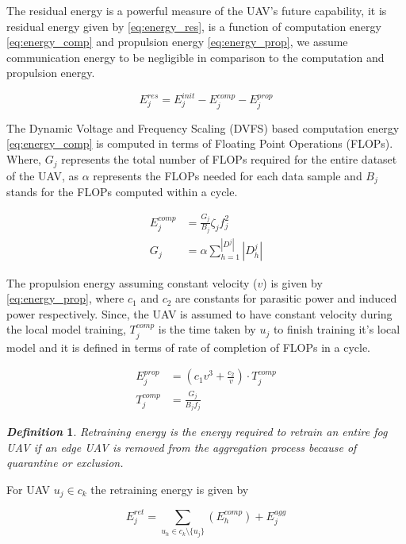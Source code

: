 \documentclass[10pt,journal,compsoc]{IEEEtran}
\newtheorem{mydef}{\textbf{\textit{Definition}}}
\begin{document}
The residual energy is a powerful measure of the UAV's future capability, it is residual energy given by \eqref{eq:energy_res}, is a function of computation energy \eqref{eq:energy_comp} and propulsion energy \eqref{eq:energy_prop}, we assume communication energy to be negligible in comparison to the computation and propulsion energy.

\begin{equation}\label{eq:energy_res}
E_j^{res} = E_j^{init} - E_j^{comp} - E_j^{prop}
\end{equation}

The Dynamic Voltage and Frequency Scaling (DVFS) based computation energy \eqref{eq:energy_comp} \cite{comp_energy} is computed in terms of Floating Point Operations (FLOPs).
Where, $G_j$ represents the total number of FLOPs required for the entire dataset of the UAV, as $\alpha$ represents the FLOPs needed for each data sample and $B_j$ stands for the FLOPs computed within a cycle. 

\begin{align}\label{eq:energy_comp}
E_j^{comp} 
&=
\frac {G_j} {B_j} \zeta_j f_j^2
\\
G_j
&=
\alpha \sum_{h = 1}^{|D^j|} |D_h^{j}|
\end{align}

The propulsion energy assuming constant velocity ($v$) \cite{prop_energy} is given by \eqref{eq:energy_prop}, where $c_1$ and $c_2$ are constants for parasitic power and induced power respectively. Since, the UAV is assumed to have constant velocity during the local model training, $T_j^{comp}$ is the time taken by $u_j$ to finish training it's local model and it is defined in terms of rate of completion of FLOPs in a cycle.

\begin{align}\label{eq:energy_prop}
E_j^{prop} 
&= 
\left( c_1 v^3 + \frac {c_2} {v} \right) 
\cdot
T_j^{comp}
\\
T_j^{comp}
&=
\frac{G_j}{B_j f_j}
\end{align}


\begin{mydef}
 Retraining energy is the energy required to retrain an entire fog UAV if an edge UAV is removed from the aggregation process because of quarantine or exclusion.
\end{mydef}

For UAV $u_j \in c_k$ the retraining energy is given by

\begin{equation}\label{eq:energy_ret}
E_j^{ret}
=
\sum_{u_h \in c_k \setminus \{u_j\}}
(E_h^{comp})
+
E_j^{agg}
\end{equation}
\end{document}
